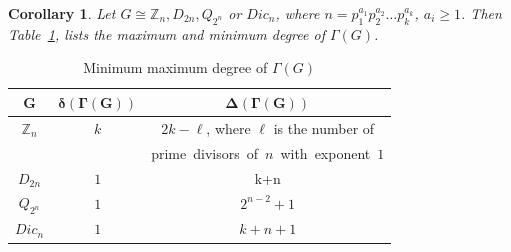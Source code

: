 \documentclass[11pt,twoside]{amsart}
\def \Z {{\mathbb{Z}}}
\def \Ga {{\Gamma }}
\newtheorem{cor}[theorem]{Corollary}
\begin{document}
   \begin{cor}\label{cor:maxmin}
       Let $G\cong \Z_n, D_{2n}, Q_{2^n}$ or $Dic_n$, where $n=p_1^{a_1}p_2^{a_2}\dots p_k^{a_k}$, $a_i\geq 1$. Then Table~\ref{tab:MaxMinDegree}, lists the maximum and minimum degree of $\Gamma (G)$.
   \end{cor}
    \begin{table}[ht!]
\centering
\begin{tabular}{|c|c|c|}
 \hline
 $\mathbf{G}$ & $\mathbf{\delta (\Ga (G))}$ & $\mathbf{\Delta (\Ga (G))}$ \\
 \hline
  $\Z_n$ &
   $k$ &  $2k-\ell$, where $\ell$ is the number of\\
              & & \mbox{prime divisors of $n$ with exponent $1$}\\

   \hline
  $D_{2n}$ &
    $1$ & k+n\\
    \hline
  $Q_{2^n}$ & $1$ & $2^{n-2}+1$\\
  \hline
  $Dic_{n}$ & $1$ & $k+n+1$\\

  \hline
 \end{tabular}\\
 \caption{Minimum maximum degree of $\Gamma (G)$}
           \label{tab:MaxMinDegree}
       \end{table}
\end{document}
